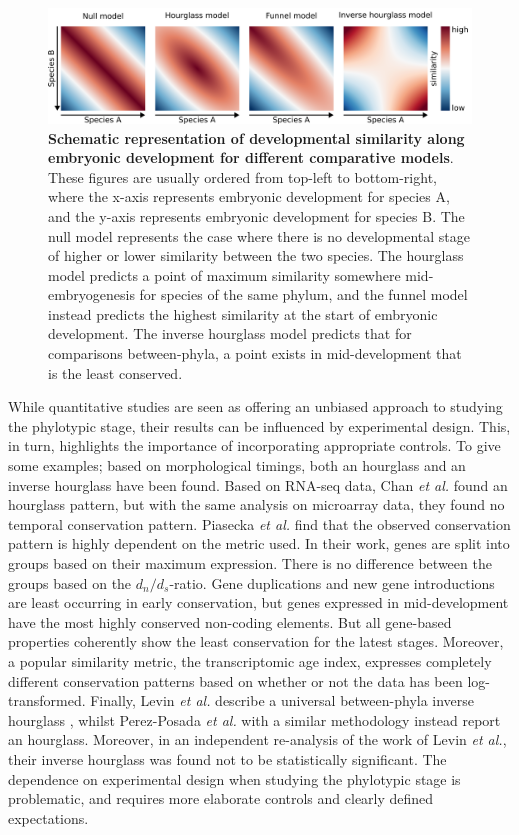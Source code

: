 \begin{figure}[H]
    \includegraphics[width=\linewidth]{ch.hourglass/images/models.png}
    \caption{\textbf{Schematic representation of developmental similarity along embryonic development for different comparative models}. These figures are usually ordered from top-left to bottom-right, where the x-axis represents embryonic development for species A, and the y-axis represents embryonic development for species B. The null model represents the case where there is no developmental stage of higher or lower similarity between the two species. The hourglass model predicts a point of maximum similarity somewhere mid-embryogenesis for species of the same phylum, and the funnel model instead predicts the highest similarity at the start of embryonic development. The inverse hourglass model predicts that for comparisons between-phyla, a point exists in mid-development that is the least conserved.}
    \label{fig:models}
\end{figure}

While quantitative studies are seen as offering an unbiased approach to studying the phylotypic stage, their results can be influenced by experimental design. This, in turn, highlights the importance of incorporating appropriate controls. To give some examples; based on morphological timings, both an hourglass\cite{Cordero2020} and an inverse hourglass\cite{OlafRP2003} have been found. Based on RNA-seq data, Chan \textit{et al.} found an hourglass pattern, but with the same analysis on microarray data, they found no temporal conservation pattern\cite{Chan2021}. Piasecka \textit{et al.} find that the observed conservation pattern is highly dependent on the metric used. In their work, genes are split into groups based on their maximum expression. There is no difference between the groups based on the $d_n / d_s$-ratio. Gene duplications and new gene introductions are least occurring in early conservation, but genes expressed in mid-development have the most highly conserved non-coding elements. But all gene-based properties coherently show the least conservation for the latest stages\cite{Piasecka2013}. Moreover, a popular similarity metric, the transcriptomic age index\cite{DomazetLoso2010}, expresses completely different conservation patterns based on whether or not the data has been log-transformed\cite{Piasecka2013}. Finally, Levin \textit{et al.} describe a universal between-phyla inverse hourglass \cite{Levin2016}, whilst Perez-Posada \textit{et al.} with a similar methodology instead report an hourglass\cite{PerezPosada2022}. Moreover, in an independent re-analysis of the work of Levin \textit{et al.}, their inverse hourglass was found not to be statistically significant\cite{Dunn2018}. The dependence on experimental design when studying the phylotypic stage is problematic, and requires more elaborate controls and clearly defined expectations.

